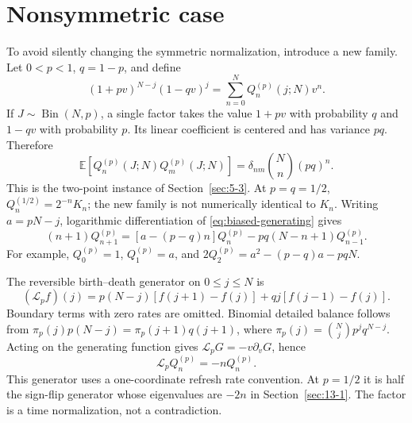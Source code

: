 \section{Nonsymmetric case}
\label{sec:13-2}
To avoid silently changing the symmetric normalization, introduce a new family. Let $0<p<1$, $q=1-p$, and define
\begin{equation}\label{eq:biased-generating}
(1+pv)^{N-j}(1-qv)^j=\sum_{n=0}^N Q_n^{(p)}(j;N)v^n.
\end{equation}
If $J\sim\operatorname{Bin}(N,p)$, a single factor takes the value $1+pv$ with probability $q$ and $1-qv$ with probability $p$. Its linear coefficient is centered and has variance $pq$. Therefore
\[
\mathbb E[Q_n^{(p)}(J;N)Q_m^{(p)}(J;N)]
=\delta_{nm}\binom Nn(pq)^n.
\]
This is the two-point instance of Section~\ref{sec:5-3}. At $p=q=1/2$, $Q_n^{(1/2)}=2^{-n}K_n$; the new family is not numerically identical to $K_n$.
Writing $a=pN-j$, logarithmic differentiation of \eqref{eq:biased-generating} gives
\[
(n+1)Q_{n+1}^{(p)}=[a-(p-q)n]Q_n^{(p)}-pq(N-n+1)Q_{n-1}^{(p)}.
\]
For example, $Q_0^{(p)}=1$, $Q_1^{(p)}=a$, and $2Q_2^{(p)}=a^2-(p-q)a-pqN$.

The reversible birth--death generator on $0\le j\le N$ is
\[
(\mathcal L_pf)(j)=p(N-j)[f(j+1)-f(j)]+qj[f(j-1)-f(j)].
\]
Boundary terms with zero rates are omitted. Binomial detailed balance follows from
$\pi_p(j)p(N-j)=\pi_p(j+1)q(j+1)$, where $\pi_p(j)=\binom Njp^jq^{N-j}$. Acting on the generating function gives $\mathcal L_pG=-v\partial_vG$, hence
\[
\mathcal L_pQ_n^{(p)}=-nQ_n^{(p)}.
\]
This generator uses a one-coordinate refresh rate convention. At $p=1/2$ it is half the sign-flip generator whose eigenvalues are $-2n$ in Section~\ref{sec:13-1}. The factor is a time normalization, not a contradiction.

